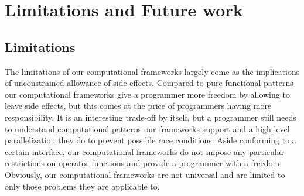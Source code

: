 \section{Limitations and Future work}
\label{frameworks_future_work}
\subsection{Limitations}
\label{frameworks_limitations}
\quad The limitations of our computational frameworks largely come as the implications of unconstrained allowance of side effects. Compared to pure functional patterns our computational frameworks give a programmer more freedom by allowing to leave side effects, but this comes at the price of programmers having more responsibility. It is an interesting trade-off by itself, but a programmer still needs to understand computational patterns our frameworks support and a high-level parallelization they do to prevent possible race conditions. Aside conforming to a certain interface, our computational frameworks do not impose any particular restrictions on operator functions and provide a programmer with a freedom. Obviously, our computational frameworks are not universal and are limited to only those problems they are applicable to.
